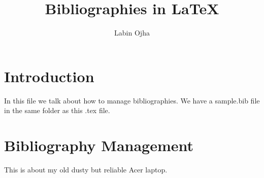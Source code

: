 \documentclass{article}
\author{Labin Ojha}
\title{Bibliographies in {\LaTeX}}
\begin{document}
\maketitle

\section{Introduction}

In this file we talk about how to manage bibliographies.
We have a sample.bib file in the same folder as this .tex file.

\section{Bibliography Management}

This is about my old dusty but reliable Acer laptop.\cite{ojha01}

{}

\end{document}

